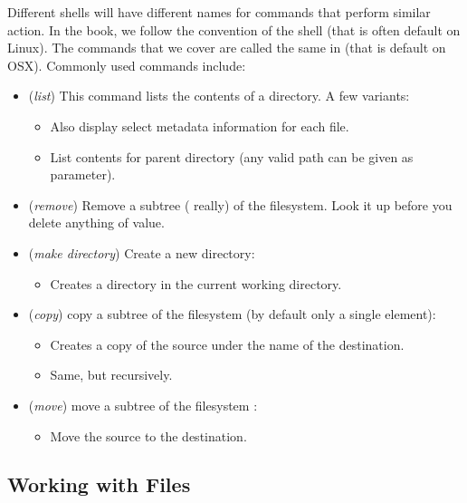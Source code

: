 Different shells will have different names for commands that perform similar action. In the book, we follow the convention of the  shell (that is often default on Linux). The commands that we cover are called the same in  (that is default on OSX). Commonly used commands include:
\begin{itemize}
  \item {} (\textsl{list}) This command lists the contents of a directory. A few variants:
    \begin{itemize}
      \item {} Also display select metadata information for each file.
      \item {} List contents for parent directory (any valid path can be given as parameter).
    \end{itemize}
  \item {} (\textsl{remove}) Remove a subtree ( really) of the filesystem. Look it up before you delete anything of value.
  \item {} (\textsl{make directory}) Create a new directory:
    \begin{itemize}
      \item {} Creates a directory in the current working directory.
    \end{itemize}
  \item {} (\textsl{copy}) copy a subtree of the filesystem (by default only a single element):
    \begin{itemize}
      \item {} Creates a copy of the source under the name of the destination.
      \item {} Same, but recursively.
    \end{itemize}
  \item {} (\textsl{move}) move a subtree of the filesystem :
    \begin{itemize}
      \item {} Move the source to the destination.
    \end{itemize}
\end{itemize}

\subsection{Working with Files}

